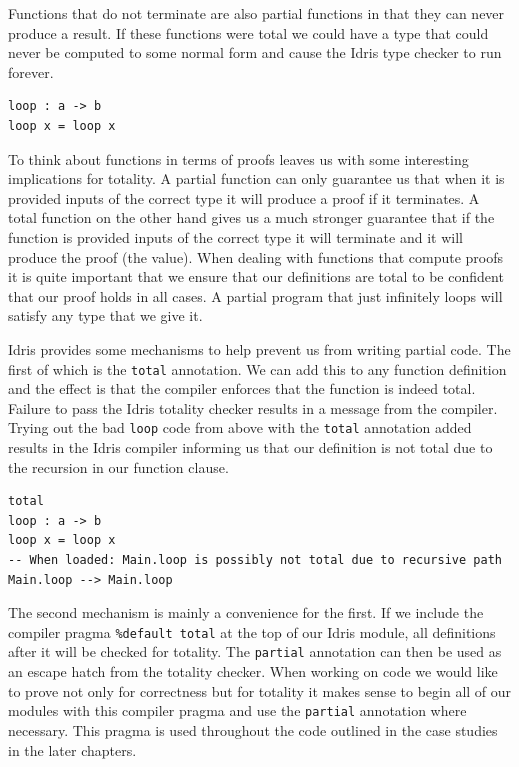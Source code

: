 \documentclass[a4paper, notitlepage]{report}
\begin{document}
Functions that do not terminate are also partial functions in that they can
never produce a result. If these functions were total we could have a type that
could never be computed to some normal form and cause the Idris type checker to
run forever.

\begin{verbatim}
loop : a -> b
loop x = loop x
\end{verbatim}

To think about functions in terms of proofs leaves us with some interesting
implications for totality. A partial function can only guarantee us that when it
is provided inputs of the correct type it will produce a proof if it terminates.
A total function on the other hand gives us a much stronger guarantee that if
the function is provided inputs of the correct type it will terminate and it
will produce the proof (the value). When dealing with functions that compute
proofs it is quite important that we ensure that our definitions are total to be
confident that our proof holds in all cases. A partial program that just
infinitely loops will satisfy any type that we give it.

Idris provides some mechanisms to help prevent us from writing partial code. The
first of which is the \texttt{total} annotation. We can add this to any function
definition and the effect is that the compiler enforces that the function is
indeed total. Failure to pass the Idris totality checker results in a message
from the compiler. Trying out the bad \texttt{loop} code from above with the \texttt{total}
annotation added results in the Idris compiler informing us that our definition
is not total due to the recursion in our function clause.

\begin{verbatim}
total
loop : a -> b
loop x = loop x
-- When loaded: Main.loop is possibly not total due to recursive path Main.loop --> Main.loop
\end{verbatim}

The second mechanism is mainly a convenience for the first. If we include the
compiler pragma \texttt{\%default total} at the top of our Idris module, all definitions
after it will be checked for totality. The \texttt{partial} annotation can then be used
as an escape hatch from the totality checker. When working on code we would like
to prove not only for correctness but for totality it makes sense to begin all
of our modules with this compiler pragma and use the \texttt{partial} annotation where
necessary. This pragma is used throughout the code outlined in the case studies
in the later chapters.
\end{document}
